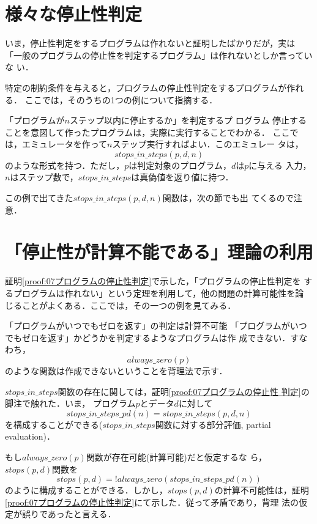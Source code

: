 \section{様々な停止性判定}
いま，停止性判定をするプログラムは作れないと証明したばかりだが，実は
「一般のプログラムの停止性を判定するプログラム」は作れないとしか言っていな
い．

特定の制約条件を与えると，プログラムの停止性判定をするプログラムが作れる．
ここでは，そのうちの1つの例について指摘する．

\begin{myexample}{「プログラムが$n$ステップ以内に停止するか」を判定するプ
 ログラム}
 停止することを意図して作ったプログラムは，実際に実行することでわかる．
 ここでは，エミュレータ\footnotemark を作って$n$ステップ実行すればよい．このエミュレー
 タは，
 \[
 stops\_in\_steps(p, d, n)
 \]
 のような形式を持つ．ただし，$p$は判定対象のプログラム，$d$は$p$に与える
 入力，$n$はステップ数で，$stops\_in\_steps$は真偽値を返り値に持つ．
\end{myexample}
この例で出てきた$stops\_in\_steps(p, d, n)$関数は，次の節でも出
てくるので注意．

\section{「停止性が計算不能である」理論の利用}
証明\ref{proof:07プログラムの停止性判定}で示した，「プログラムの停止性判定を
するプログラムは作れない」という定理を利用して，他の問題の計算可能性を論
じることがよくある．ここでは，その一つの例を見てみる．

\begin{myproof}{「プログラムがいつでもゼロを返す」の判定は計算不可能}
「プログラムがいつでもゼロを返す」かどうかを判定するようなプログラムは作
 成できない．すなわち，
\[
always\_zero(p)
\]
のような関数は作成できないということを背理法で示す．

$stops\_in\_steps$関数の存在に関しては，証明\ref{proof:07プログラムの停止性
 判定}の脚注で触れた．いま，
プログラム$p$とデータ$d$に対して
\[
stops\_in\_steps\_pd (n) = stops\_in\_steps(p,d,n) 
\]
を構成することができる($stops\_in\_steps$関数に対する部分評価, partial evaluation)\footnotemark．

もし$always\_zero(p)$関数が存在可能(計算可能)だと仮定するな
 ら，$stops(p,d)$関数を
\[
stops(p, d) = !always\_zero(stops\_in\_steps\_pd (n))
\]
のように構成することができる．しかし，$stops(p,d)$の計算不可能性は，証明
 \ref{proof:07プログラムの停止性判定}にて示した．従って矛盾であり，背理
 法の仮定が誤りであったと言える．
\end{myproof}


